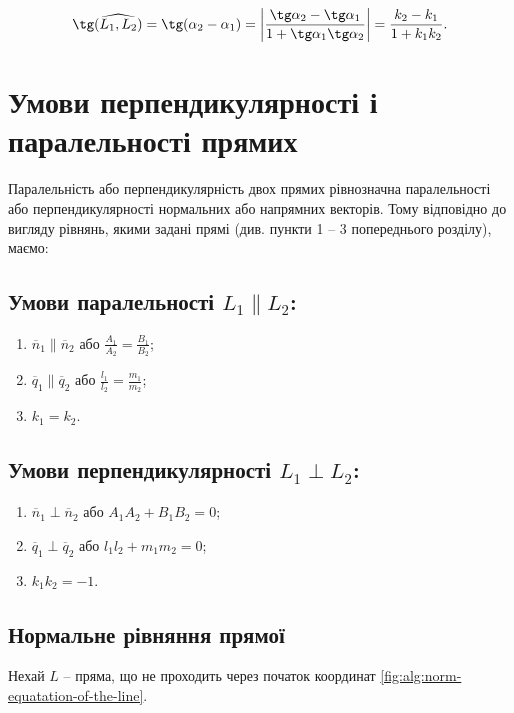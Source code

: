 $$\tg(\widehat{L_1,L_2})
= \tg(\alpha_2 - \alpha_1)
= \left|\dfrac{\tg\alpha_2 - \tg\alpha_1}{1+\tg\alpha_1\tg\alpha_2}\right|
= \dfrac{k_2 - k_1}{1+k_1k_2}.$$

\newpage

\parbox{\textwidth - 0.6cm}{\section{Умови перпендикулярності і паралельності прямих}}

Паралельність або перпендикулярність двох прямих рівнозначна
паралельності або перпендикулярності нормальних або напрямних векторів. Тому
відповідно до вигляду рівнянь, якими задані прямі (див. пункти 1 – 3 попереднього
розділу), маємо:

\subsection*{Умови паралельності $L_1 \parallel L_2$:}

\begin{enumerate}
	\item $\overline{n}_1 \parallel \overline{n}_2$ або $\frac{A_1}{A_2} = \frac{B_1}{B_2}$;
	\item $\overline{q}_1 \parallel \overline{q}_2$ або $\frac{l_1}{l_2} = \frac{m_1}{m_2}$;
	\item $k_1 = k_2$.
\end{enumerate}

\subsection*{Умови перпендикулярності $L_1 \perp L_2$:}

\begin{enumerate}
	\item $\overline{n}_1 \perp \overline{n}_2$ або $A_1A_2 + B_1B_2 = 0$;
	\item $\overline{q}_1 \perp \overline{q}_2$ або $l_1l_2 + m_1m_2 = 0$;
	\item $k_1k_2 = -1$.
\end{enumerate}

\subsection{Нормальне рівняння прямої}

    Нехай $L$ -- пряма, що не проходить через початок координат \ref{fig:alg:norm-equatation-of-the-line}.
    
